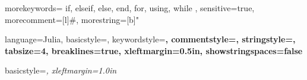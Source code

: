 \usepackage{listings}

{
	morekeywords={
		if, elseif, else, end, for, using, while
	},
	sensitive=true,      %
	morecomment=[l]{\#}, %
	morestring=[b]"
}


{
	language=Julia,
	basicstyle=\ttfamily,
	keywordstyle=\bfseries\color{blue},
	commentstyle=\color{ForestGreen},
	stringstyle=\color{magenta},
	tabsize=4,
	breaklines=true,
	xleftmargin=0.5in,
	showstringspaces=false %
}

{
	basicstyle=\itshape,
	xleftmargin=1.0in
}
